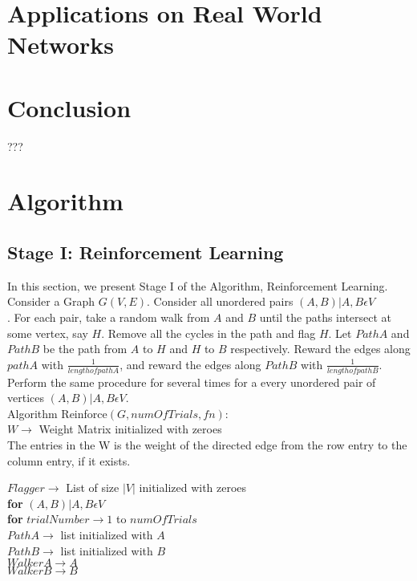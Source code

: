 \documentclass{article}
\begin{document}
\section{Applications on Real World Networks}

\section{Conclusion}
???
\section{Algorithm}
\subsection{Stage I: Reinforcement Learning}
In this section, we present Stage I of the Algorithm, Reinforcement Learning. Consider a Graph $G(V,E)$. Consider all unordered pairs $(A,B) | A,B\epsilon V$\\. For each pair, take a random walk from $A$ and $B$ until the paths intersect at some vertex, say $H$. Remove all the cycles in the path and flag $H$. Let $PathA$ and $PathB$ be the path from $A$ to $H$ and $H$ to $B$ respectively. Reward the edges along $pathA$ with $\frac{1}{length of pathA}$, and reward the edges along $PathB$ with $\frac{1}{length of pathB}$. Perform the same procedure for several times for a every unordered pair of vertices $(A,B) | A,B \epsilon V$.\\

Algorithm Reinforce$(G, numOfTrials, fn)$:\\
	$ W \to $ Weight Matrix initialized with zeroes\\
	The entries in the W is the weight of the directed edge from the row entry to the column entry, if it exists.
	
	$Flagger \to $ List of size $|V|$ initialized with zeroes\\
	
	\textbf{for} $(A,B) | A,B \epsilon V$\\
		\textbf{for} $trialNumber \to 1$ to $numOfTrials$\\
			$PathA \to $ list initialized with $A$\\
			$PathB \to $ list initialized with $B$\\
			
			$WalkerA \to A$\\
			$WalkerB \to B$\\
			
\end{document}
